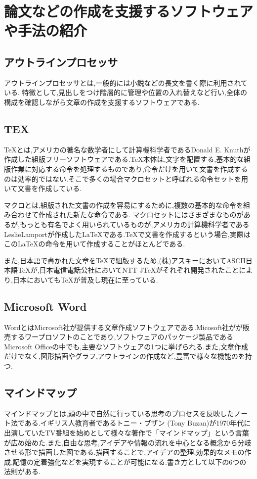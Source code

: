 \documentclass[a4j,12pt]{jarticle}
\begin{document}
\newpage
\section{論文などの作成を支援するソフトウェアや手法の紹介}
\subsection{アウトラインプロセッサ}
アウトラインプロセッサとは,一般的には小説などの長文を書く際に利用されている.
特徴として,見出しをつけ階層的に管理や位置の入れ替えなど行い,全体の構成を確認しながら文章の作成を支援するソフトウェアである.
\subsection{TEX}
TeXとは,アメリカの著名な数学者にして計算機科学者であるDonald E. Knuthが作成した組版フリーソフトウェアである.TeX本体は,文字を配置する,基本的な組版作業に対応する命令を処理するものであり,命令だけを用いて文書を作成するのは効率的ではない.そこで多くの場合マクロセットと呼ばれる命令セットを用いて文書を作成している.

マクロとは,組版された文書の作成を容易にするために,複数の基本的な命令を組み合わせて作成された新たな命令である.
マクロセットにはさまざまなものがあるが,もっとも有名でよく用いられているものが,アメリカの計算機科学者であるLeslieLamportが作成したLaTeXである.TeXで文書を作成するという場合,実際はこのLaTeXの命令を用いて作成することがほとんどである.

また,日本語で書かれた文章をTeXで組版するため,(株)アスキーにおいてASCII日本語TeXが,日本電信電話公社においてNTT JTeXがそれぞれ開発されたことにより,日本においてもTeXが普及し現在に至っている\cite{ren3}.

\subsection{Microsoft Word}
WordとはMicrosoft社が提供する文章作成ソフトウェアである.Micosoft社がが販売するワープロソフトのことであり,ソフトウェアのパッケージ製品であるMicrosoft Officeの中でも,主要なソフトウェアの1つに挙げられる.また,文章作成だけでなく,図形描画やグラフ,アウトラインの作成など,豊富で様々な機能のを持つ.
\newpage
\subsection{マインドマップ}
マインドマップとは,頭の中で自然に行っている思考のプロセスを反映したノート法である.イギリス人教育者であるトニー・ブザン (Tony Buzan)が1970年代に出演していたTV番組を始めとして様々な著作で「マインドマップ」という言葉が広め始めた\cite{ren4}.また,自由な思考,アイデアや情報の流れを中心となる概念から分岐させる形で描画した図である.描画することで,アイデアの整理,効果的なメモの作成,記憶の定着強化などを実現することが可能になる.書き方として以下の6つの法則がある\cite{ren5}.
\end{document}
